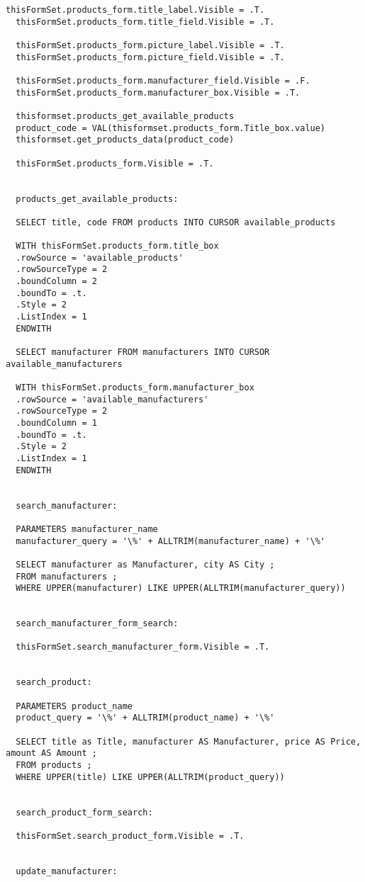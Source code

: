 \begin{lstlisting}[caption=crud\_formset\_procedures]
  thisFormSet.products_form.title_label.Visible = .T.
  thisFormSet.products_form.title_field.Visible = .T.

  thisFormSet.products_form.picture_label.Visible = .T.
  thisFormSet.products_form.picture_field.Visible = .T.

  thisFormSet.products_form.manufacturer_field.Visible = .F.
  thisFormSet.products_form.manufacturer_box.Visible = .T.

  thisformset.products_get_available_products
  product_code = VAL(thisformset.products_form.Title_box.value)
  thisformset.get_products_data(product_code)

  thisFormSet.products_form.Visible = .T.


  products_get_available_products:

  SELECT title, code FROM products INTO CURSOR available_products

  WITH thisFormSet.products_form.title_box
  .rowSource = 'available_products'
  .rowSourceType = 2
  .boundColumn = 2
  .boundTo = .t.
  .Style = 2
  .ListIndex = 1
  ENDWITH

  SELECT manufacturer FROM manufacturers INTO CURSOR available_manufacturers

  WITH thisFormSet.products_form.manufacturer_box
  .rowSource = 'available_manufacturers'
  .rowSourceType = 2
  .boundColumn = 1
  .boundTo = .t.
  .Style = 2
  .ListIndex = 1
  ENDWITH


  search_manufacturer:

  PARAMETERS manufacturer_name
  manufacturer_query = '\%' + ALLTRIM(manufacturer_name) + '\%'

  SELECT manufacturer as Manufacturer, city AS City ;
  FROM manufacturers ;
  WHERE UPPER(manufacturer) LIKE UPPER(ALLTRIM(manufacturer_query))


  search_manufacturer_form_search:

  thisFormSet.search_manufacturer_form.Visible = .T.


  search_product:

  PARAMETERS product_name
  product_query = '\%' + ALLTRIM(product_name) + '\%'

  SELECT title as Title, manufacturer AS Manufacturer, price AS Price, amount AS Amount ;
  FROM products ;
  WHERE UPPER(title) LIKE UPPER(ALLTRIM(product_query))


  search_product_form_search:

  thisFormSet.search_product_form.Visible = .T.


  update_manufacturer:


\end{lstlisting}
